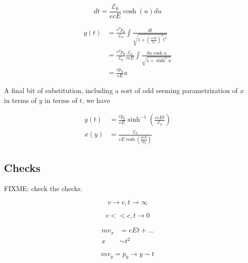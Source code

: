 \begin{equation}\label{eqn:relativisticElectrodynamicsT3:380}
dt = \frac{\mathcal{E}_0}{ e c E} \cosh(u) du
\end{equation}

\begin{align*}
y(t) 
&= \frac{c^2 p_0}{\mathcal{E}_0} \int \frac{dt}{\sqrt{1 + (\frac{e c E}{\mathcal{E}_0})^2 t^2 }} \\
&= \frac{c^2 p_0}{\mathcal{E}_0} 
\frac{\mathcal{E}_0}{ e c E} 
\int \frac{ du \cosh u }{\sqrt{1 + \sinh^2 u }} \\
&= \frac{c p_0}{ e E} u 
\end{align*}

A final bit of substitution, including a sort of odd seeming parametrization of $x$ in terms of $y$ in terms of $t$, we have

\begin{equation}\label{eqn:relativisticElectrodynamicsT3:400}
\boxed{
\begin{aligned}
y(t) &= \frac{c p_0}{ e E} \sinh^{-1} \left( \frac{e c E t}{\mathcal{E}_0} \right) \\
x(y) &= \frac{\mathcal{E}_0}{c E \cosh \left( \frac{y e E }{ c p_0} \right) }
\end{aligned}
}
\end{equation}

\subsection{Checks}

FIXME: check the checks.

\begin{equation}\label{eqn:relativisticElectrodynamicsT3:420}
v \rightarrow c, t \rightarrow \infty
\end{equation}

\begin{equation}\label{eqn:relativisticElectrodynamicsT3:440}
v << c, t \rightarrow 0
\end{equation}

\begin{align*}
m v_x &= e E t + ... \\
x &\sim t^2 
\end{align*}

\begin{equation}\label{eqn:relativisticElectrodynamicsT3:460}
m v_y = p_0 \rightarrow y \sim t
\end{equation}

